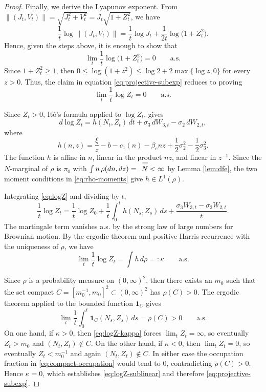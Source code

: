 \documentclass[12pt,a4paper,reqno]{amsart}
\theoremstyle{definition}
\theoremstyle{remark}
\theoremstyle{plain}
\let\svoverline\overline
\newcommand{\uc}[1]{\mkern 5mu\svoverline{\mkern-1mu#1\mkern-0.3mu \rule{0pt}{3.5mm}}\mkern 0mu}
\let\overline\uc
\begin{document}
\begin{proof}
Finally, we derive the Lyapunov exponent. From $\|(J_t,V_t)\|=\sqrt{J_t^2+V_t^2}=J_t\sqrt{1+Z_t^2}$, we have
\begin{equation}\label{eq:norm-projective}
\frac{1}{t}\log\|(J_t,V_t)\|
=
\frac{1}{t}\log J_t
+
\frac{1}{2t}\log\big(1+Z_t^2\big).
\end{equation}
Hence, given the steps above, it is enough to show that
\begin{equation}\label{eq:projective-subexp}
\lim_t \frac{1}{t}\log\big(1+Z_t^2\big)= 0
\qquad\text{a.s.}
\end{equation}
Since $1+Z_t^2\ge 1$, then $0\le\log(1+z^2)\le\log 2+2\max\{\log z,0\}$ for every $z>0$. Thus, the claim in equation \eqref{eq:projective-subexp} reduces to
proving
\begin{equation}\label{eq:logZ-sublinear}
\lim_t \frac{1}{t}\log Z_t= 0
\qquad\text{a.s.}
\end{equation}

Since $Z_t>0$, It\^o's formula applied to $\log Z_t$, gives
\begin{equation}\label{eq:logZ}
d\log Z_t
=
h(N_t,Z_t)\,dt
+\sigma_3\,dW_{3,t}-\sigma_2\,dW_{2,t},
\end{equation} where
$$
h(n,z)
=
\frac{\xi}{z}-b-c_1(n)-\beta_e nz+\frac12\sigma_2^2-\frac12\sigma_3^2.
$$
The function $h$ is affine in $n$, linear in the product $nz$, and linear in $z^{-1}$. Since the $N$-marginal of $\rho$ is $\pi_0$ with $\int n\,\rho(dn,dz)=\overline N<\infty$ by Lemma \ref{lem:dfe}, the two moment conditions in \eqref{eq:rho-moments} give $h\in L^1(\rho)$.

Integrating \eqref{eq:logZ} and dividing by $t$,
$$
\frac{1}{t}\log Z_t
=
\frac{1}{t}\log Z_0
+\frac{1}{t}\int_0^t h(N_s,Z_s)\,ds
+\frac{\sigma_3W_{3,t}-\sigma_2W_{2,t}}{t}.
$$
The martingale term vanishes a.s. by the strong law of large numbers for Brownian motion. By the ergodic theorem and positive Harris recurrence with the uniqueness of $\rho$, we have
\begin{equation}\label{eq:logZ-kappa}
\lim_t\frac{1}{t}\log Z_t=\int h\,d\rho =:\kappa
\qquad\text{a.s.}
\end{equation}

Since $\rho$ is a probability measure on $(0,\infty)^2$, then there exists an $m_0$ such that the set compact $C=[m_0^{-1},m_0]^2\subset(0,\infty)^2$ has $\rho(C)>0$. The ergodic theorem applied to the bounded function $\mathbf 1_C$ gives
\begin{equation}\label{eq:compact-occupation}
\lim_t \frac{1}{t}\int_0^t\mathbf 1_C(N_s,Z_s)\,ds=\rho(C)>0
\qquad\text{a.s.}
\end{equation}
On one hand, if $\kappa>0$, then \eqref{eq:logZ-kappa} forces $\lim_t Z_t=\infty$, so eventually $Z_t>m_0$ and $(N_t,Z_t)\notin C$. On the other hand, if $\kappa<0$, then $\lim_tZ_t= 0$, so eventually $Z_t<m_0^{-1}$ and again $(N_t,Z_t)\notin C$. In either case the occupation fraction in \eqref{eq:compact-occupation} would tend to $0$, contradicting $\rho(C)>0$. Hence $\kappa=0$, which establishes \eqref{eq:logZ-sublinear} and therefore \eqref{eq:projective-subexp}.


\end{proof}
\end{document}
